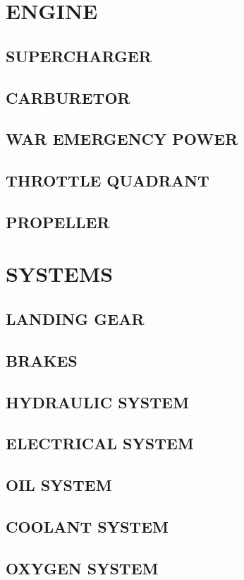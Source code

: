 \section{ENGINE}
\subsection{SUPERCHARGER}
\subsection{CARBURETOR}
\subsection{WAR EMERGENCY POWER}
\subsection{THROTTLE QUADRANT}
\subsection{PROPELLER}


\section{SYSTEMS}
\subsection{LANDING GEAR}
\subsection{BRAKES}
\subsection{HYDRAULIC SYSTEM}
\subsection{ELECTRICAL SYSTEM}
\subsection{OIL SYSTEM}
\subsection{COOLANT SYSTEM}
\subsection{OXYGEN SYSTEM}
